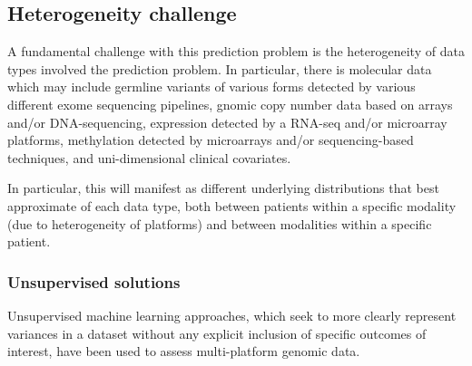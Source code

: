 \subsection{Heterogeneity challenge}

A fundamental challenge with this prediction problem is the heterogeneity of data types involved the prediction problem. In particular, there is molecular data which may include germline variants of various forms detected by various different exome sequencing pipelines, gnomic copy number data based on arrays and/or DNA-sequencing, expression detected by a RNA-seq and/or microarray platforms, methylation detected by microarrays and/or sequencing-based techniques, and uni-dimensional clinical covariates. 


In particular, this will manifest as different underlying distributions that best approximate of each data type, both between patients within a specific modality (due to heterogeneity of platforms) and between modalities within a specific patient.


\subsubsection{Unsupervised solutions}

Unsupervised machine learning approaches, which seek to more clearly represent variances in a dataset without any explicit inclusion of specific outcomes of interest, have been used to assess multi-platform genomic data.

